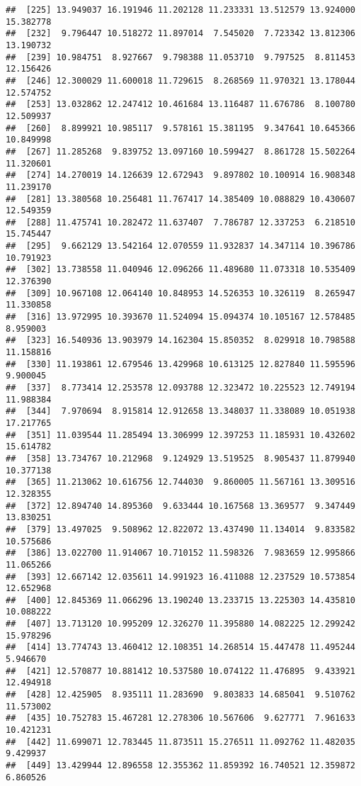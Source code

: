 \documentclass[
]{article}
\begin{document}
\begin{verbatim}
##  [225] 13.949037 16.191946 11.202128 11.233331 13.512579 13.924000 15.382778
##  [232]  9.796447 10.518272 11.897014  7.545020  7.723342 13.812306 13.190732
##  [239] 10.984751  8.927667  9.798388 11.053710  9.797525  8.811453 12.156426
##  [246] 12.300029 11.600018 11.729615  8.268569 11.970321 13.178044 12.574752
##  [253] 13.032862 12.247412 10.461684 13.116487 11.676786  8.100780 12.509937
##  [260]  8.899921 10.985117  9.578161 15.381195  9.347641 10.645366 10.849998
##  [267] 11.285268  9.839752 13.097160 10.599427  8.861728 15.502264 11.320601
##  [274] 14.270019 14.126639 12.672943  9.897802 10.100914 16.908348 11.239170
##  [281] 13.380568 10.256481 11.767417 14.385409 10.088829 10.430607 12.549359
##  [288] 11.475741 10.282472 11.637407  7.786787 12.337253  6.218510 15.745447
##  [295]  9.662129 13.542164 12.070559 11.932837 14.347114 10.396786 10.791923
##  [302] 13.738558 11.040946 12.096266 11.489680 11.073318 10.535409 12.376390
##  [309] 10.967108 12.064140 10.848953 14.526353 10.326119  8.265947 11.330858
##  [316] 13.972995 10.393670 11.524094 15.094374 10.105167 12.578485  8.959003
##  [323] 16.540936 13.903979 14.162304 15.850352  8.029918 10.798588 11.158816
##  [330] 11.193861 12.679546 13.429968 10.613125 12.827840 11.595596  9.900045
##  [337]  8.773414 12.253578 12.093788 12.323472 10.225523 12.749194 11.988384
##  [344]  7.970694  8.915814 12.912658 13.348037 11.338089 10.051938 17.217765
##  [351] 11.039544 11.285494 13.306999 12.397253 11.185931 10.432602 15.614782
##  [358] 13.734767 10.212968  9.124929 13.519525  8.905437 11.879940 10.377138
##  [365] 11.213062 10.616756 12.744030  9.860005 11.567161 13.309516 12.328355
##  [372] 12.894740 14.895360  9.633444 10.167568 13.369577  9.347449 13.830251
##  [379] 13.497025  9.508962 12.822072 13.437490 11.134014  9.833582 10.575686
##  [386] 13.022700 11.914067 10.710152 11.598326  7.983659 12.995866 11.065266
##  [393] 12.667142 12.035611 14.991923 16.411088 12.237529 10.573854 12.652968
##  [400] 12.845369 11.066296 13.190240 13.233715 13.225303 14.435810 10.088222
##  [407] 13.713120 10.995209 12.326270 11.395880 14.082225 12.299242 15.978296
##  [414] 13.774743 13.460412 12.108351 14.268514 15.447478 11.495244  5.946670
##  [421] 12.570877 10.881412 10.537580 10.074122 11.476895  9.433921 12.494918
##  [428] 12.425905  8.935111 11.283690  9.803833 14.685041  9.510762 11.573002
##  [435] 10.752783 15.467281 12.278306 10.567606  9.627771  7.961633 10.421231
##  [442] 11.699071 12.783445 11.873511 15.276511 11.092762 11.482035  9.429937
##  [449] 13.429944 12.896558 12.355362 11.859392 16.740521 12.359872  6.860526

\end{verbatim}
\end{document}
